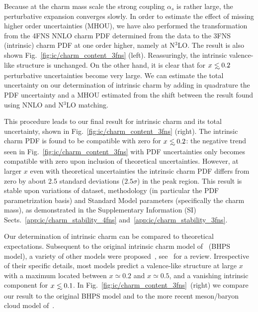 \documentclass[11pt,a4paper]{article}
\def\lsim{\mathrel{\rlap{\lower4pt\hbox{\hskip1pt$\sim$}}
    \raise1pt\hbox{$<$}}}         %
\begin{document}
Because at the charm mass scale the strong coupling $\alpha_s$ is rather
large, the perturbative expansion converges slowly.
%
In order to
estimate the effect of missing higher order uncertainties (MHOU), we
have also performed the transformation from the 4FNS NNLO charm PDF
determined from the data to the 3FNS (intrinsic) charm PDF at one
order higher, namely at N$^3$LO. 
%
The result is also shown
Fig.~\ref{fig:ic/charm_content_3fns} (left). Reassuringly, the intrinsic
valence-like structure is unchanged.
%
On the other hand, it is clear that for
$x\lsim 0.2$ perturbative uncertainties become very large.
%
We can estimate  the total uncertainty on our determination
of intrinsic charm by adding in quadrature the PDF uncertainty and a
MHOU estimated from the shift between the result found using NNLO
and N$^3$LO matching.

This procedure leads to our final result for intrinsic charm and its total
uncertainty, shown in Fig.~\ref{fig:ic/charm_content_3fns} (right).
%
The intrinsic charm PDF is found to be compatible with zero for
$x\lsim 0.2$: the negative trend 
seen  in Fig.~\ref{fig:ic/charm_content_3fns} with PDF uncertainties only 
becomes 
compatible with zero upon inclusion of  theoretical
uncertainties. However, at
larger $x$ even with theoretical uncertainties
the intrinsic charm PDF
 differs 
from zero by about 2.5 standard deviations ($2.5\sigma$) in the peak region.
%
This result  is stable upon variations of dataset, methodology (in
particular the PDF  parametrization basis) and Standard Model
parameters (specifically the charm mass),
as demonstrated in the Supplementary Information (SI) Sects.~\ref{app:ic/charm_stability_4fns}
and~\ref{app:ic/charm_stability_3fns}. 

Our determination of intrinsic charm can be compared to theoretical expectations.
%
Subsequent to the
original intrinsic charm model of~\cite{Brodsky:1980pb} (BHPS
model),
a variety of other models were  
proposed~\cite{Hoffmann:1983ah,Pumplin:2005yf,Paiva:1996dd,Steffens:1999hx,Hobbs:2013bia},
see~\cite{Brodsky:2015fna} for a review.
%
Irrespective of their specific details, most models predict a valence-like
structure at large $x$ 
with a maximum located  between $x\simeq 0.2$ and $x\simeq 0.5$, and a
vanishing intrinsic component for
$x\lsim 0.1$.
%
In Fig.~\ref{fig:ic/charm_content_3fns}~(right) we compare our result to
the original BHPS model and to the more recent meson/baryon cloud model of~\cite{Hobbs:2013bia}.
\end{document}
